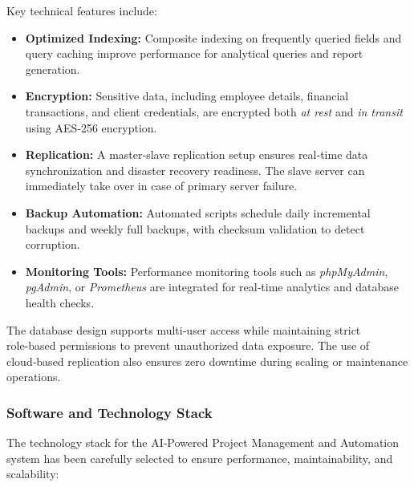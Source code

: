 \documentclass[12pt,a4paper]{article}
\begin{document}
Key technical features include:
\begin{itemize}
    \item \textbf{Optimized Indexing:} Composite indexing on frequently queried fields and query caching improve performance for analytical queries and report generation.
    
    \item \textbf{Encryption:} Sensitive data, including employee details, financial transactions, and client credentials, are encrypted both \textit{at rest} and \textit{in transit} using AES‑256 encryption.
    
    \item \textbf{Replication:} A master‑slave replication setup ensures real‑time data synchronization and disaster recovery readiness.  The slave server can immediately take over in case of primary server failure.
    
    \item \textbf{Backup Automation:} Automated scripts schedule daily incremental backups and weekly full backups, with checksum validation to detect corruption.
    
    \item \textbf{Monitoring Tools:} Performance monitoring tools such as \textit{phpMyAdmin}, \textit{pgAdmin}, or \textit{Prometheus} are integrated for real‑time analytics and database health checks.
\end{itemize}

The database design supports multi‑user access while maintaining strict role‑based permissions to prevent unauthorized data exposure.  The use of cloud‑based replication also ensures zero downtime during scaling or maintenance operations.

\subsubsection{Software and Technology Stack}
The technology stack for the AI‑Powered Project Management and Automation system has been carefully selected to ensure performance, maintainability, and scalability:
\end{document}
